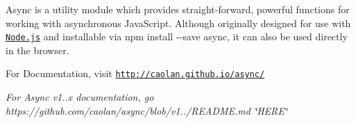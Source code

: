 

\href{https://travis-ci.org/caolan/async}{\tt } \href{https://www.npmjs.com/package/async}{\tt } \href{https://coveralls.io/r/caolan/async?branch=master}{\tt } \href{https://gitter.im/caolan/async?utm_source=badge&utm_medium=badge&utm_campaign=pr-badge&utm_content=badge}{\tt }

Async is a utility module which provides straight-\/forward, powerful functions for working with asynchronous Java\+Script. Although originally designed for use with \href{https://nodejs.org/}{\tt Node.\+js} and installable via {\ttfamily npm install -\/-\/save async}, it can also be used directly in the browser.

For Documentation, visit \href{http://caolan.github.io/async/}{\tt http\+://caolan.\+github.\+io/async/}

{\itshape For Async v1..\+x documentation, go https\+://github.com/caolan/async/blob/v1../\+R\+E\+A\+D\+ME.md \char`\"{}\+H\+E\+R\+E\char`\"{}} 